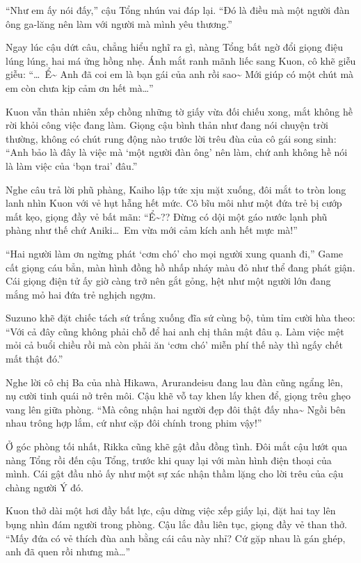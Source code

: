 \documentclass[../main.tex]{subfiles}
\begin{document}
``Như em ấy nói đấy,'' cậu Tổng nhún vai đáp lại. ``Đó là điều mà một người đàn ông ga-lăng nên làm với người mà mình yêu thương.''

Ngay lúc cậu dứt câu, chẳng hiểu nghĩ ra gì, nàng Tổng bất ngờ đổi giọng điệu lúng lúng, hai má ửng hồng nhẹ. Ánh mắt ranh mãnh liếc sang Kuon, cô khẽ giễu giễu: ``\dots\ Ể\~{} Anh đã coi em là bạn gái của anh rồi sao\~{} Mới giúp có một chút mà em còn chưa kịp cảm ơn hết mà\dots''

Kuon vẫn thản nhiên xếp chồng những tờ giấy vừa đối chiếu xong, mắt không hề rời khỏi công việc đang làm. Giọng cậu bình thản như đang nói chuyện trời thường, không có chút rung động nào trước lời trêu đùa của cô gái song sinh: ``Anh bảo là đây là việc mà `một người đàn ông' nên làm, chứ anh không hề nói là làm việc của `bạn trai' đâu.''

Nghe câu trả lời phũ phàng, Kaiho lập tức xịu mặt xuống, đôi mắt to tròn long lanh nhìn Kuon với vẻ hụt hẫng hết mức. Cô bĩu môi như một đứa trẻ bị cướp mất kẹo, giọng đầy vẻ bất mãn: ``Ể\~{}?? Đừng có dội một gáo nước lạnh phũ phàng như thế chứ Aniki\dots\ Em vừa mới cảm kích anh hết mực mà!''

``Hai người làm ơn ngừng phát `cơm chó' cho mọi người xung quanh đi,'' Game cất giọng cáu bẳn, màn hình đồng hồ nhấp nháy màu đỏ như thể đang phát giận. Cái giọng điện tử ấy giờ càng trở nên gắt gỏng, hệt như một người lớn đang mắng mỏ hai đứa trẻ nghịch ngợm.

Suzuno khẽ đặt chiếc tách sứ trắng xuống đĩa sứ cùng bộ, tủm tỉm cười hùa theo: ``Với cả đây cũng không phải chỗ để hai anh chị thân mật đâu ạ. Làm việc mệt mỏi cả buổi chiều rồi mà còn phải ăn `cơm chó' miễn phí thế này thì ngấy chết mất thật đó.''

Nghe lời cô chị Ba của nhà Hikawa, Arurandeisu đang lau đàn cũng ngẩng lên, nụ cười tinh quái nở trên môi. Cậu khẽ vỗ tay khen lấy khen để, giọng trêu ghẹo vang lên giữa phòng. ``Mà công nhận hai người đẹp đôi thật đấy nha\~{} Ngồi bên nhau trông hợp lắm, cứ như cặp đôi chính trong phim vậy!''

Ở góc phòng tối nhất, Rikka cũng khẽ gật đầu đồng tình. Đôi mắt cậu lướt qua nàng Tổng rồi đến cậu Tổng, trước khi quay lại với màn hình điện thoại của mình. Cái gật đầu nhỏ ấy như một sự xác nhận thầm lặng cho lời trêu của cậu chàng người Ý đó.

Kuon thở dài một hơi đầy bất lực, cậu dừng việc xếp giấy lại, đặt hai tay lên bụng nhìn đám người trong phòng. Cậu lắc đầu liên tục, giọng đầy vẻ than thở. ``Mấy đứa có vẻ thích đùa anh bằng cái câu này nhỉ? Cứ gặp nhau là gán ghép, anh đã quen rồi nhưng mà\dots''
\end{document}
